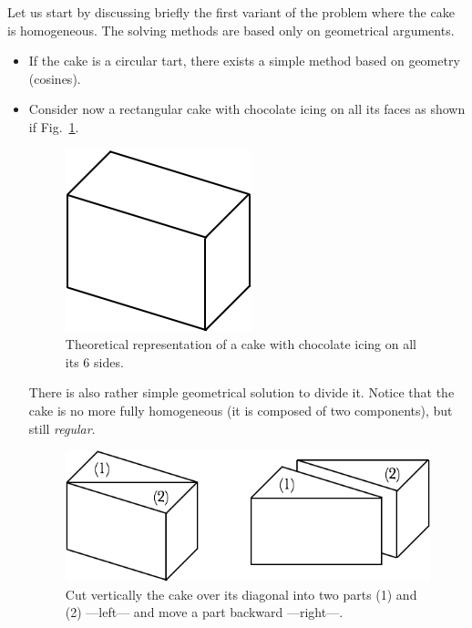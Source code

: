 \bigskip

Let us start by discussing briefly the first variant of the problem where the cake is homogeneous. 
The solving methods are based only on geometrical arguments. 
\begin{itemize}
\item If the cake is a circular tart, there exists a simple method based on geometry (cosines).
\item Consider now a rectangular cake with chocolate icing on all its faces as shown if Fig.~\ref{Fig:cakeHomogeneous1}.
\begin{figure}[htb]
\begin{center}
        \includegraphics[scale=0.4]{FiguresMaths/CakeHomogeneous1}
        \caption{Theoretical representation of a cake with chocolate icing on all its 6 sides.}
        \label{Fig:cakeHomogeneous1}
\end{center}
\end{figure}
There is also rather simple geometrical solution to divide it. 
Notice that the cake is no more fully homogeneous (it is composed of two components), but still \textit{regular}. 
\begin{figure}[htb]
\begin{center}
        \includegraphics[scale=0.4]{FiguresMaths/CakeHomogeneous2}
        \caption{Cut vertically the cake over its diagonal into two parts (1) and (2) ---left--- and move a part backward ---right---.}
        \label{Fig:cakeHomogeneous2}
\end{center}
\end{figure}

\end{itemize}

